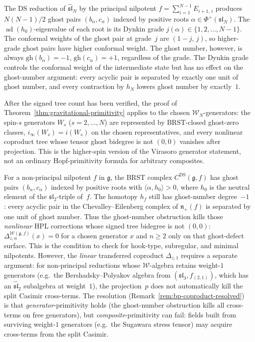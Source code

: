 The DS reduction of $\widehat{\mathfrak{sl}}_N$ by the
principal nilpotent $f = \sum_{i=1}^{N-1} E_{i+1,\,i}$
produces $N(N-1)/2$ ghost pairs
$(b_\alpha, c_\alpha)$ indexed by positive roots
$\alpha \in \Phi^+(\mathfrak{sl}_N)$. The
$\operatorname{ad}(h_0)$-eigenvalue of each root is
its Dynkin grade $j(\alpha) \in \{1, 2, \ldots, N-1\}$.
The conformal weights of the ghost pair at grade~$j$ are
$(1-j,\, j)$, so higher-grade ghost pairs have higher
conformal weight. The ghost number, however, is always
$\mathrm{gh}(b_\alpha) = -1$, $\mathrm{gh}(c_\alpha) = +1$,
regardless of the grade. The Dynkin grade controls the
conformal weight of the intermediate state but has no effect
on the ghost-number argument: every acyclic pair is separated
by exactly one unit of ghost number, and every contraction
by $h_N$ lowers ghost number by exactly~$1$.

After the signed tree count has been verified, the proof of
Theorem~\ref{thm:gravitational-primitivity} applies to the chosen
\(\mathcal W_N\)-generators: the spin-$s$ generators \(W_s\)
(\(s=2,\ldots,N\)) are represented by BRST-closed ghost-zero classes,
\(i_\infty(W_s)=i(W_s)\) on the chosen representatives, and every
nonlinear coproduct tree whose tensor ghost bidegree is not \((0,0)\)
vanishes after projection. This is the higher-spin version of the
Virasoro generator statement, not an ordinary Hopf-primitivity formula
for arbitrary composites.

\begin{remark}
\label{rem:non-principal-ghost}
For a non-principal nilpotent $f$ in $\mathfrak{g}$, the BRST
complex $C^{\mathrm{DS}}(\mathfrak{g}, f)$ has ghost pairs
$(b_\alpha, c_\alpha)$ indexed by positive roots with
$\langle \alpha, h_0 \rangle > 0$, where $h_0$ is the neutral
element of the $\mathfrak{sl}_2$-triple of~$f$. The homotopy
$h_f$ still has ghost-number degree~$-1$: every acyclic pair
in the Chevalley--Eilenberg complex of $\mathfrak{n}_+(f)$
is separated by one unit of ghost number. Thus the
ghost-number obstruction kills those \emph{nonlinear} HPL
corrections whose signed tree bidegree is not \((0,0)\):
\(\Delta_{z,n}^{\mathcal{W}(\mathfrak{g},f)}(x)=0\) for a chosen
generator \(x\) and \(n\ge2\) only on that ghost-defect surface.
This is the condition to check for hook-type, subregular, and minimal
nilpotents. However, the
\emph{linear} transferred coproduct $\Delta_{z,1}$ requires a
separate argument: for non-principal reductions whose
$\mathcal{W}$-algebra retains weight-$1$ generators (e.g.\
the Bershadsky--Polyakov algebra from $(\mathfrak{sl}_3,
f_{(2,1)})$, which has an $\widehat{\mathfrak{sl}}_2$
subalgebra at weight~$1$), the projection~$p$ does not
automatically kill the split Casimir cross-terms. The
resolution (Remark~\ref{rem:bp-coproduct-resolved}) is that
\emph{generator}-primitivity holds (the ghost-number
obstruction kills all cross-terms on free generators), but
\emph{composite}-primitivity can fail: fields built from
surviving weight-$1$ generators (e.g.\ the Sugawara stress
tensor) may acquire cross-terms from the split Casimir.
\end{remark}

